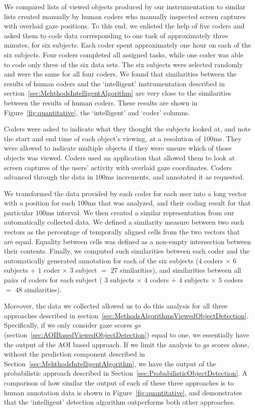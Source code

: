 We compared lists of viewed objects produced by our instrumentation to similar lists created manually by human coders who manually inspected screen captures with overlaid gaze positions. To this end, we enlisted the help of five coders and asked them to code data corresponding to one task of approximately three minutes, for six subjects.  Each coder spent approximately one hour on each of the six subjects. Four coders completed all assigned tasks, while one coder was able to code only three of the six data sets. The six subjects were selected randomly and were the same for all four coders. We found that similarities between the results of human coders and the `intelligent' instrumentation described in section~\ref{sec:MehthodsIntelligentAlgorithm} are very close to the similarities between the results of human coders. These results are shown in Figure~\ref{fig:quantitative}, the `intelligent' and `coder' columns.

Coders were asked to indicate what they thought the subjects looked at, and note the start and end time of each object's viewing, at a resolution of $100$ms. They were allowed to indicate multiple objects if they were unsure which of those objects was viewed. Coders used an application that allowed them to look at screen captures of the users' activity with overlaid gaze coordinates. Coders advanced through the data in $100$ms increments, and annotated it as requested. 

We transformed the data provided by each coder for each user into a long vector with a position for each $100$ms that was analyzed, and their coding result for that particular $100$ms interval. We then created a similar representation from our automatically collected data. We defined a similarity measure between two such vectors as the percentage of temporally aligned cells from the two vectors that are equal. Equality between cells was defined as a non-empty intersection between their contents. Finally, we computed such similarities between each coder and the automatically generated annotation for each of the six subjects ($4$ coders $\times$ $6$ subjects $+$ $1$ coder $\times$ $3$ subject $=$ $27$ similarities), and similarities between all pairs of coders for each subject ( $3$ subjects $\times$ $4$ coders $+$ $4$ subjects $\times$ $5$ coders $=$ $48$ similarities). 

Moreover, the data we collected allowed us to do this analysis for all three approaches described in section~\ref{sec:MethodsAlgorithmsViewedObjectDetection}. Specifically, if we only consider gaze scores $gs$ (section~\ref{sec:AOIBasedViewedObjectDetection}) equal to one, we essentially have the output of the AOI based approach. If we limit the analysis to $gs$ scores alone, without the prediction component described in Section~\ref{sec:MehthodsIntelligentAlgorithm}, we have the output of the probabilistic approach described in Section~\ref{sec:ProbabilisticObjectDetection}. A comparison of how similar the output of each of these three approaches is to human annotation data is shown in Figure~\ref{fig:quantitative}, and demonstrates that the `intelligent' detection algorithm outperforms both other approaches.

